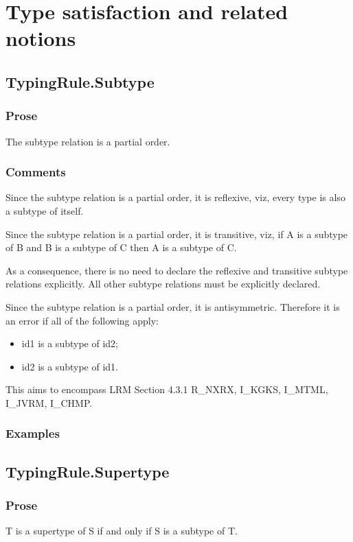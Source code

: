 \documentclass{book}
\begin{document}
\chapter{Type satisfaction and related notions}

\section{TypingRule.Subtype} 

\subsection{Prose}
  The subtype relation is a partial order.

\subsection{Comments}
  Since the subtype relation is a partial order, it is reflexive, viz, 
  every type is also a subtype of itself.

  Since the subtype relation is a partial order, it is transitive, viz, if A is
  a subtype of B and B is a subtype of C then A is a subtype of C.
 
  As a consequence, there is no need to declare the reflexive and transitive
  subtype relations explicitly. All other subtype relations must be explicitly
  declared.
 
  Since the subtype relation is a partial order, it is antisymmetric. Therefore
  it is an error if all of the following apply:
  \begin{itemize}
  \item  id1 is a subtype of id2;
  \item  id2 is a subtype of id1.
  \end{itemize}

  This aims to encompass LRM Section 4.3.1 R\_NXRX, I\_KGKS, I\_MTML, I\_JVRM, I\_CHMP.

\subsection{Examples}

\section{TypingRule.Supertype}

\subsection{Prose}
  T is a supertype of S if and only if S is a subtype of T.
\end{document}
